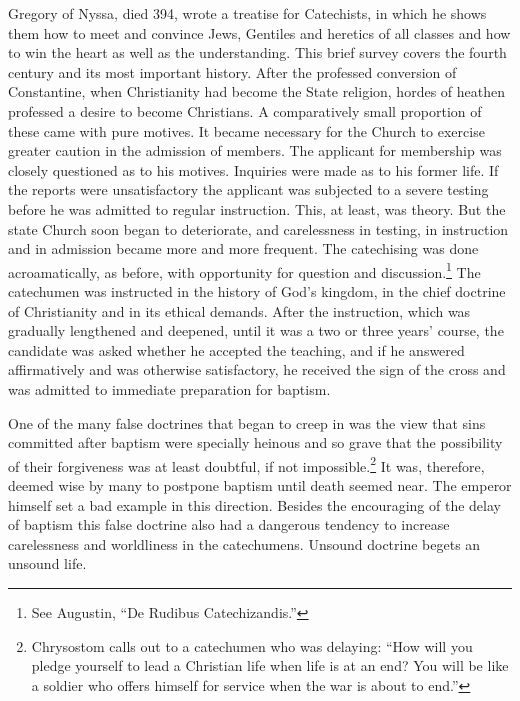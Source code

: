 Gregory of Nyssa, died 394, wrote a treatise for Catechists, in which he shows them how to meet and convince Jews, Gentiles and heretics of all classes and how to win the heart as well as the understanding. This brief survey covers the fourth century and its most important history.
 After the professed conversion of Constantine, when Christianity had become the State religion, hordes of heathen professed a desire to become Christians. A comparatively small proportion of these came with pure motives. It became necessary for the Church to exercise greater caution in the admission of members. The applicant for membership was closely questioned as to his motives. Inquiries were made as to his former life. If the reports were unsatisfactory the applicant was subjected to a severe testing before he was admitted to regular instruction. This, at least, was theory. But the state Church soon began to deteriorate, and carelessness in testing, in instruction and in admission became more and more frequent. The catechising was done acroamatically, as before, with opportunity for question and discussion.\footnote{See Augustin, “De Rudibus Catechizandis.”} The catechumen was instructed in the history of God’s kingdom, in the chief doctrine of Christianity and in its ethical demands. After the instruction, which was gradually lengthened and deepened, until it was a two or three years’ course, the candidate was asked whether he accepted the teaching, and if he answered affirmatively and was otherwise satisfactory, he received the sign of the cross and was admitted to immediate preparation for baptism.

One of the many false doctrines that began to
creep in was the view that sins committed after baptism were specially heinous and so grave that the possibility of their forgiveness was at least doubtful, if not impossible.\footnote{Chrysostom calls out to a catechumen who was delaying: “How will you pledge yourself to lead a Christian life when life is at an end? You will be like a soldier who offers himself for service when the war is about to end.”}  It was, therefore, deemed wise by many to postpone baptism until death seemed near. The emperor himself set a bad example in this direction. Besides the encouraging of the delay of baptism  this false doctrine also had a dangerous tendency to increase carelessness and worldliness in the catechumens. Unsound doctrine begets an unsound life.

